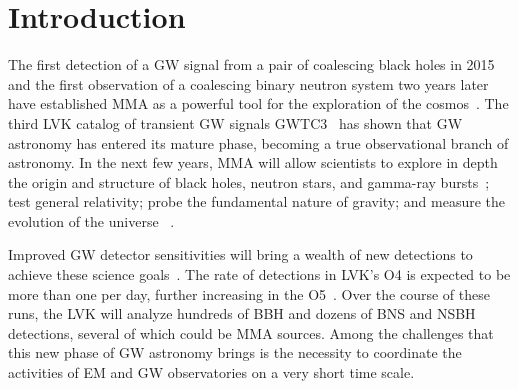 \section{Introduction\label{intro}}

The first detection of a \ac{GW} signal from a pair of coalescing black holes in 2015 and the first observation of a coalescing binary neutron system two years later
have established \ac{MMA} as a powerful tool for the exploration of the cosmos~\cite{LIGOScientific:2016aoc,LIGOScientific:2017vwq}. The third \ac{LVK} catalog of transient \ac{GW} signals \ac{GWTC3}~\cite{LIGOScientific:2021djp}
has shown that \ac{GW} astronomy has entered its mature phase, becoming a true observational branch of astronomy. In the next few years, \ac{MMA} will allow scientists
to explore in depth the origin and structure of black holes, neutron stars, and gamma-ray bursts~\cite{Ciolfi:2018tal}; test general relativity; probe the fundamental nature of gravity; and
measure the evolution of the universe~\cite{LIGOScientific:2021sio,LIGOScientific:2021psn,LIGOScientific:2021aug} . 

Improved \ac{GW} detector sensitivities will bring a wealth of new detections to achieve these science goals~\cite{LIGOScientific:2014pky,VIRGO:2014yos}. The rate
of detections in \ac{LVK}'s \ac{O4} is expected to be more than one per day, further increasing in the \ac{O5}~\cite{KAGRA:2013rdx}. Over the course of
these runs, the \ac{LVK} will analyze hundreds of \ac{BBH} and dozens of \ac{BNS} and \ac{NSBH} detections, several of which could be \ac{MMA} sources. Among the
challenges that this new phase of \ac{GW} astronomy brings is the necessity to coordinate the activities of \ac{EM} and \ac{GW} observatories on a very short time
scale. 

